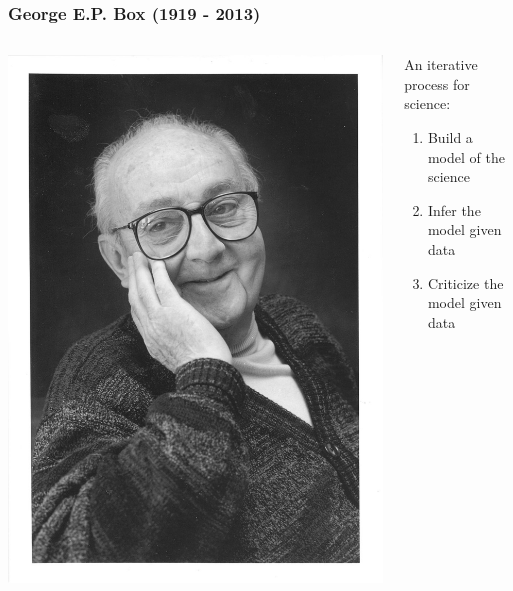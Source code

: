 \documentclass[10pt,
               xcolor={usenames,dvipsnames},
               hyperref={colorlinks,linktoc=all,citecolor=Plum,linkcolor=MidnightBlue,urlcolor=MidnightBlue},noamssymb]{beamer}
\begin{document}
\begin{frame}
\frametitle{George E.P. Box (1919 - 2013)}
\begin{columns}
\begin{column}{0.5\textwidth}
    \begin{center}
     \includegraphics[width=\columnwidth]{img/box.jpg}
     \end{center}
\end{column}
\begin{column}{0.5\textwidth}
An iterative process for science:
\\[1ex]
\begin{enumerate}
\item Build a model of the science
\\[1ex]
\item Infer the model given data
\\[1ex]
\item Criticize the model given data
\end{enumerate}
\end{column}
\end{columns}
\end{frame}
\end{document}
